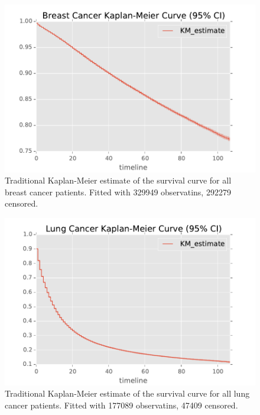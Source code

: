 \documentclass[10pt,letterpaper]{article}
\begin{document}
\begin{figure}[tbp]
\centering 
\begin{center}
\includegraphics[width=.90\textwidth,origin=c]{breastkaplan.pdf}
\caption{\label{fig:breastkaplan} Traditional Kaplan-Meier estimate of the survival curve for all breast cancer patients. Fitted with 329949 observatins, 292279 censored.}
\end{center}
\end{figure}


\begin{figure}[tbp]
\centering 
\begin{center}
\includegraphics[width=.90\textwidth,origin=c]{lungkaplan.pdf}
\caption{\label{fig:lungkaplan} Traditional Kaplan-Meier estimate of the survival curve for all lung cancer patients. Fitted with 177089 observatins, 47409 censored.}
\end{center}
\end{figure}
\end{document}
